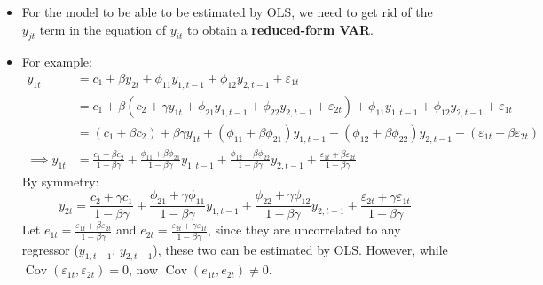 \documentclass[notitlepage]{article}
\DeclareMathOperator{\Cov}{Cov}
\begin{document}
\begin{itemize}
    \item For the model to be able to be estimated by OLS, we need to get rid of the \(y_{jt}\) term in the equation of \(y_{it}\) to obtain a \textbf{reduced-form VAR}.
    \item For example:
    \begin{align*}
        y_{1t} &= c_1 + \beta y_{2t} + \phi_{11}y_{1,t-1} + \phi_{12}y_{2,t-1} + \varepsilon_{1t} \\
        &= c_1 + \beta (c_2 + \gamma y_{1t} + \phi_{21}y_{1,t-1} + \phi_{22}y_{2,t-1} + \varepsilon_{2t}) + \phi_{11}y_{1,t-1} + \phi_{12}y_{2,t-1} + \varepsilon_{1t} \\
        &= (c_1 + \beta c_2) + \beta \gamma y_{1t} + (\phi_{11} + \beta \phi_{21}) y_{1,t-1} + (\phi_{12} + \beta \phi_{22}) y_{2,t-1} + (\varepsilon_{1t} + \beta \varepsilon_{2t}) \\
        \implies y_{1t} &= \frac{c_1 + \beta c_2}{1-\beta\gamma} + \frac{\phi_{11} + \beta \phi_{21}}{{1-\beta\gamma}} y_{1,t-1} + \frac{\phi_{12} + \beta \phi_{22}}{1-\beta\gamma} y_{2,t-1} + \frac{\varepsilon_{1t} + \beta \varepsilon_{2t}}{1-\beta\gamma}
    \end{align*}
    By symmetry:
    \[
    y_{2t} = \frac{c_2 + \gamma c_1}{1-\beta\gamma} + \frac{\phi_{21} + \gamma \phi_{11}}{{1-\beta\gamma}} y_{1,t-1} + \frac{\phi_{22} + \gamma \phi_{12}}{1-\beta\gamma} y_{2,t-1} + \frac{\varepsilon_{2t} + \gamma \varepsilon_{1t}}{1-\beta\gamma}
    \]
    Let \(e_{1t} = \frac{\varepsilon_{1t} + \beta \varepsilon_{2t}}{1-\beta\gamma}\) and \(e_{2t} = \frac{\varepsilon_{2t} + \gamma \varepsilon_{1t}}{1-\beta\gamma}\), since they are uncorrelated to any regressor (\(y_{1,t-1}\), \(y_{2,t-1}\)), these two can be estimated by OLS. However, while \(\Cov(\varepsilon_{1t}, \varepsilon_{2t}) =0 \), now \(\Cov(e_{1t}, e_{2t}) \ne 0\).


\end{itemize}
\end{document}
